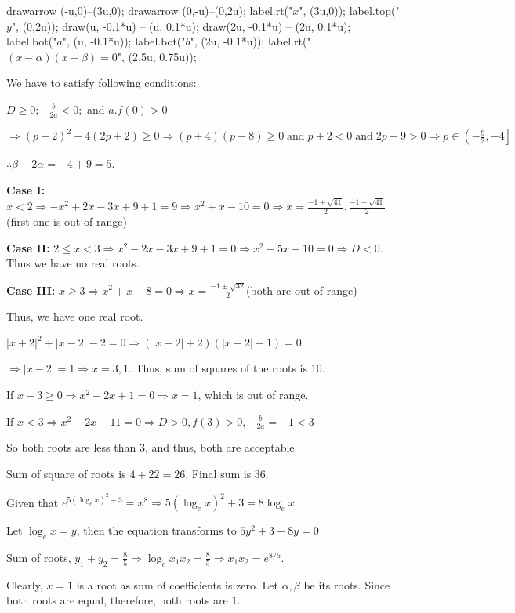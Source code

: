       drawarrow (-u,0)--(3u,0);
      drawarrow (0,-u)--(0,2u);
      label.rt("$x$", (3u,0));
      label.top("$y$", (0,2u));
      draw(u, -0.1*u) -- (u, 0.1*u);
      draw(2u, -0.1*u) -- (2u, 0.1*u);
      label.bot("$a$", (u, -0.1*u));
      label.bot("$b$", (2u, -0.1*u));
      label.rt("$(x - \alpha)(x - \beta) = 0$", (2.5u, 0.75u));
    \stopMPcode
  \stopplacefigure

  We have to satisfy following conditions:

  $D\geq 0; -\frac{b}{2a} < 0;$ and $a.f(0) > 0$

  $\Rightarrow (p + 2)^2 - 4(2p + 2)\geq 0 \Rightarrow (p + 4)(p - 8)\geq 0\;\mathrm{and}\; p + 2 <
  0\;\mathrm{and}\; 2p + 9 > 0\Rightarrow p\in\left(-\frac{9}{2}, -4\right]$

  $\therefore \beta - 2\alpha = -4 + 9 = 5$.
\item {\bf Case I:} $x < 2\Rightarrow -x^2 + 2x - 3x + 9 + 1 = 9 \Rightarrow x^2 + x - 10 = 0\Rightarrow x =
  \frac{-1 + \sqrt{41}}{2}, \frac{-1 - \sqrt{41}}{2}$(first one is out of range)

  {\bf Case II:} $2\leq x < 3\Rightarrow x^2 - 2x - 3x + 9 + 1 = 0 \Rightarrow x^2 - 5x + 10 = 0\Rightarrow
  D < 0$. Thus we have no real roots.

  {\bf Case III:} $x\geq 3\Rightarrow x^2 + x - 8 = 0 \Rightarrow x = \frac{-1\pm \sqrt{32}}{2}$(both are
  out of range)

  Thus, we have one real root.
\item $|x + 2|^2 + |x - 2| - 2 = 0\Rightarrow \left(|x - 2| + 2\right)\left(|x - 2| - 1\right) = 0$

  $\Rightarrow |x - 2| = 1\Rightarrow x = 3, 1$. Thus, sum of squares of the roots is $10$.

  If $x - 3\geq 0 \Rightarrow x^2 - 2x + 1= 0 \Rightarrow x = 1$, which is out of range.

  If $x < 3 \Rightarrow x^2 + 2x - 11 = 0 \Rightarrow D > 0, f(3) > 0, -\frac{b}{2a} = -1 < 3$

  So both roots are less than $3$, and thus, both are acceptable.

  Sum of square of roots is $4 + 22 = 26$. Final sum is $36$.
\item Given that $e^{5\left(\log_ex\right)^2 + 3} = x^8\Rightarrow 5\left(\log_ex\right)^2 + 3 = 8\log_ex$

  Let $\log_ex = y$, then the equation transforms to $5y^2 + 3 - 8y = 0$

  Sum of roots, $y_1 + y_2 = \frac{8}{5}\Rightarrow \log_ex_1x_2 = \frac{8}{5}\Rightarrow x_1x_2 = e^{8/5}$.
\item Clearly, $x = 1$ is a root as sum of coefficients is zero. Let $\alpha, \beta$ be its roots. Since
  both roots are equal, therefore, both roots are $1$.

